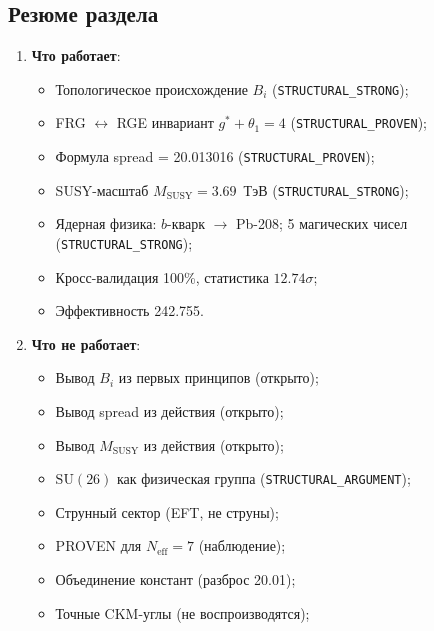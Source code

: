 \documentclass[11pt,a4paper]{article}
\newcommand{\SU}{\ensuremath{\mathrm{SU}}}
\theoremstyle{definition}
\begin{document}
\subsection{Резюме раздела}
\label{subsec:disc-summary}

\begin{enumerate}
    \item \textbf{Что работает}:
          \begin{itemize}
              \item Топологическое происхождение $B_i$
                    (\texttt{STRUCTURAL\_STRONG});
              \item FRG $\leftrightarrow$ RGE инвариант
                    $g^* + \theta_1 = 4$ (\texttt{STRUCTURAL\_PROVEN});
              \item Формула spread = 20.013016
                    (\texttt{STRUCTURAL\_PROVEN});
              \item SUSY-масштаб $M_{\text{SUSY}} = 3.69$~ТэВ
                    (\texttt{STRUCTURAL\_STRONG});
              \item Ядерная физика: $b$-кварк $\to$ Pb-208;
                    5 магических чисел (\texttt{STRUCTURAL\_STRONG});
              \item Кросс-валидация 100\%,
                    статистика $12.74\sigma$;
              \item Эффективность 242.755.
          \end{itemize}
    \item \textbf{Что не работает}:
          \begin{itemize}
              \item Вывод $B_i$ из первых принципов (открыто);
              \item Вывод spread из действия (открыто);
              \item Вывод $M_{\text{SUSY}}$ из действия (открыто);
              \item $\SU(26)$ как физическая группа
                    (\texttt{STRUCTURAL\_ARGUMENT});
              \item Струнный сектор (EFT, не струны);
              \item PROVEN для $N_{\text{eff}} = 7$ (наблюдение);
              \item Объединение констант (разброс 20.01);
              \item Точные CKM-углы (не воспроизводятся);

\end{itemize}
\end{enumerate}
\end{document}
